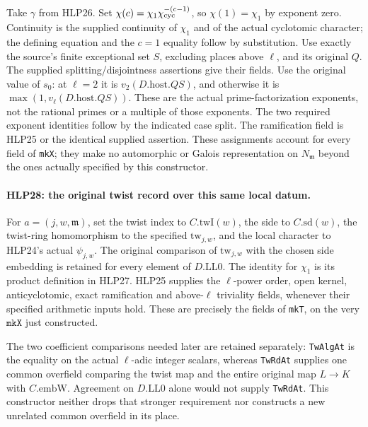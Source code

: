 Take \(\gamma\) from HLP26. Set
\(\chi(c)=\chi_1\chi_{\rm cyc}^{-(c-1)}\), so
\(\chi(1)=\chi_1\) by exponent zero. Continuity is the supplied
continuity of \(\chi_1\) and of the actual cyclotomic character;
the defining equation and the \(c=1\) equality follow by
substitution. Use exactly the source's finite exceptional set
\(S\), excluding places above \(\ell\), and its original \(Q\).
The supplied splitting/disjointness assertions give their fields.
Use the original value of \(s_0\): at \(\ell=2\) it is \(v_2(D.\mathrm{host}.QS)\), and otherwise
it is \(\max(1,v_\ell(D.\mathrm{host}.QS))\). These are the
actual prime-factorization exponents, not the rational primes
or a multiple of those exponents. The two required exponent
identities follow by the indicated case split.
The ramification field is HLP25 or the identical supplied assertion.
These assignments account for every field of \texttt{mkX}; they
make no automorphic or Galois representation on \(N_{\mathfrak m}\)
beyond the ones actually specified by this constructor.

\paragraph{HLP28: the original twist record over this same local datum.}
\label{claim:HLP28}
For \(a=(j,w,\mathfrak m)\), set the twist index to \(C.\mathrm{twI}(w)\),
the side to \(C.\mathrm{sd}(w)\), the twist-ring homomorphism to the
specified \(\mathrm{tw}_{j,w}\), and the local character to
HLP24's actual \(\psi_{j,w}\). The original comparison of
\(\mathrm{tw}_{j,w}\) with the chosen side embedding is retained
for every element of \(D.\mathrm{LL0}\). The identity for
\(\chi_1\) is its product definition in HLP27. HLP25 supplies the
\(\ell\)-power order, open kernel, anticyclotomic, exact
ramification and above-\(\ell\) triviality fields, whenever their
specified arithmetic inputs hold. These are precisely the fields
of \texttt{mkT}, on the very \(\texttt{mkX}\) just constructed.

The two coefficient comparisons needed later are retained
separately: \texttt{TwAlgAt} is the equality on the actual
\(\ell\)-adic integer scalars, whereas \texttt{TwRdAt} supplies
one common overfield comparing the twist map and the entire
original map \(L\to K\) with \(C.\mathrm{embW}\). Agreement on
\(D.\mathrm{LL0}\) alone would not supply \texttt{TwRdAt}.
This constructor neither drops that stronger requirement nor
constructs a new unrelated common overfield in its place.

